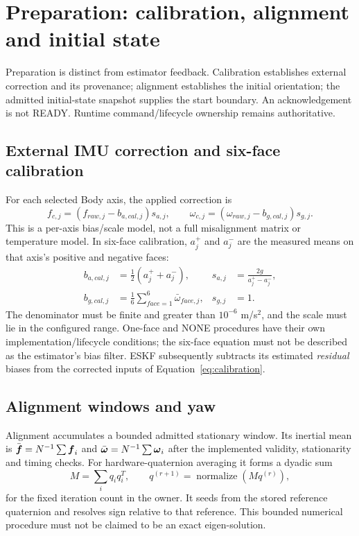 \section{Preparation: calibration, alignment and initial state}
\label{sec:preparation}
Preparation is distinct from estimator feedback. Calibration establishes external correction and its provenance; alignment establishes the initial orientation; the admitted initial-state snapshot supplies the start boundary. An acknowledgement is not READY. Runtime command/lifecycle ownership remains authoritative.

\subsection{External IMU correction and six-face calibration}
For each selected Body axis, the applied correction is
\begin{equation}
f_{c,j}=(f_{raw,j}-b_{a,cal,j})s_{a,j},\qquad
\omega_{c,j}=(\omega_{raw,j}-b_{g,cal,j})s_{g,j}.
\label{eq:calibration}
\end{equation}
This is a per-axis bias/scale model, not a full misalignment matrix or temperature model. In six-face calibration, $a_j^+$ and $a_j^-$ are the measured means on that axis's positive and negative faces:
\begin{align}
b_{a,cal,j}&=\tfrac12(a_j^++a_j^-),&s_{a,j}&=\frac{2g}{a_j^+-a_j^-},\\
b_{g,cal,j}&=\frac16\sum_{face=1}^{6}\bar\omega_{face,j},&s_{g,j}&=1.
\end{align}
The denominator must be finite and greater than $10^{-6}$ m/s$^2$, and the scale must lie in the configured range. One-face and NONE procedures have their own implementation/lifecycle conditions; the six-face equation must not be described as the estimator's bias filter. ESKF subsequently subtracts its estimated \emph{residual} biases from the corrected inputs of Equation~\eqref{eq:calibration}.


\subsection{Alignment windows and yaw}
Alignment accumulates a bounded admitted stationary window. Its inertial mean is $\bar{\boldsymbol{f}}=N^{-1}\sum\boldsymbol{f}_i$ and $\bar{\boldsymbol{\omega}}=N^{-1}\sum\boldsymbol{\omega}_i$ after the implemented validity, stationarity and timing checks. For hardware-quaternion averaging it forms a dyadic sum
\begin{equation}
M=\sum_i q_iq_i^T,\qquad
q^{(r+1)}=\operatorname{normalize}(M q^{(r)}),
\end{equation}
for the fixed iteration count in the owner. It seeds from the stored reference quaternion and resolves sign relative to that reference. This bounded numerical procedure must not be claimed to be an exact eigen-solution.

